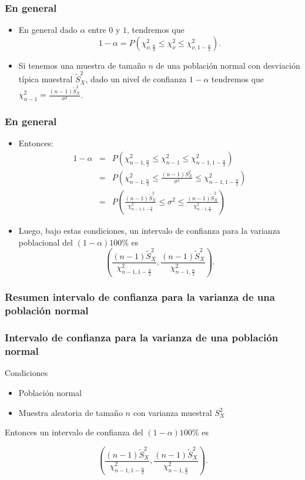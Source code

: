 \begin{frame}
     \frametitle{En general}
\begin{itemize}
\item En general dado $\alpha$ entre $0$ y $1$, tendremos que
 $$1-\alpha=P(\chi_{\nu,\frac{\alpha}{2}}^2\leq \chi_{\nu}^2\leq
    \chi_{\nu,1-\frac{\alpha}{2}}^2).$$
\item  Si tenemos una muestra de tamaño $n$ de una población normal con desviación típica muestral $\tilde{S}_{X}^2$, dado un nivel de confianza $1-\alpha$ tendremos que $\chi_{n-1}^2=\frac{(n-1)\tilde{S}_{X}^2}{\sigma^2}$.
\end{itemize}
\end{frame}

\begin{frame}
\frametitle{En general}
\begin{itemize}
\item Entonces:
\begin{eqnarray*}
1-\alpha&=&P\left(\chi_{n-1,\frac{\alpha}{2}}^2\leq \chi_{n-1}^2\leq \chi_{n-1,1-\frac{\alpha}{2}}^2\right)\\
&=& P\left(\chi_{n-1,\frac{\alpha}{2}}^2\leq \frac{(n-1)  S_{X}^2}{\sigma^2}\leq
    \chi_{n-1,1-\frac{\alpha}{2}}^2\right)\\
&=& P\left(\frac{(n-1)
\tilde{S}_{X}^2}{\chi_{n-1,1-\frac{\alpha}{2}}^2}\leq\sigma^2\leq\frac{(n-1)\tilde{S}_{X}^2}{\chi_{n-1,\frac{\alpha}{2}}^2}\right)
\end{eqnarray*}
\item Luego, bajo estas condiciones, un intervalo de confianza para la varianza poblacional del $(1-\alpha) 100\%$ es
 $$\left(  \frac{(n-1)\tilde{S}_{X}^2}{\chi_{n-1,1-\frac{\alpha}{2}}^2},\frac{(n-1)\tilde{S}_{X}^2}{\chi_{n-1,\frac{\alpha}{2}}^2}\right).$$
\end{itemize}
\end{frame}

\subsubsection{Resumen intervalo de confianza para la varianza de una población normal}

\begin{frame}
\frametitle{Intervalo de confianza para la varianza de una población normal}
Condiciones
\begin{itemize}
\item Población normal
\item Muestra aleatoria de tamaño $n$ con varianza muestral $S_{X}^2$
\end{itemize}

Entonces un intervalo de confianza del $(1-\alpha)100\%$ es

$$\left(  \frac{(n-1)\tilde{S}_{X}^2}{\chi_{n-1,1-\frac{\alpha}{2}}^2},
\frac{(n-1)\tilde{S}_{X}^2}{\chi_{n-1,\frac{\alpha}{2}}^2}\right).$$
\end{frame}

